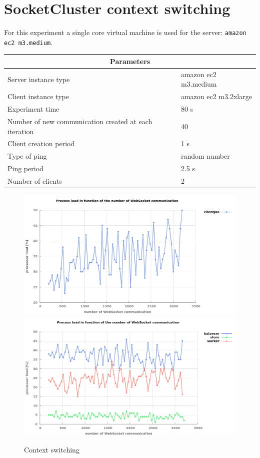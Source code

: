 
\section{SocketCluster context switching}

For this experiment a single core  virtual machine is used for the server:
\texttt{amazon ec2 m3.medium}.

\begin{center}
  \begin{tabular}{ | l | l |}
  \hline
  \multicolumn{2}{|c|}{Parameters} \\
  \hline
    Server instance type &  amazon ec2 m3.medium\\ 
    Client instance type &  amazon ec2 m3.2xlarge\\
    Experiment time & 80 s \\
    Number of new communication created at each iteration & 40 \\
    Client creation period & 1 s \\
    Type of ping & random number \\ 
    Ping period & 2.5 s \\ 
    Number of clients & 2 \\
  \hline
  \end{tabular}
\end{center}

\begin{figure}[H]
	\centering
		\includegraphics[width=\textwidth]{./Figures/WS_client_context.png}
		\includegraphics[width=\textwidth]{./Figures/WS_server_context.png}
	\caption[Context switching]{Context switching}
	\label{fig:context}
\end{figure}

